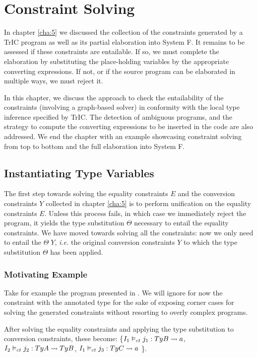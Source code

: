 \chapter{Constraint Solving}
\label{cha:6}

In chapter \ref{cha:5} we discussed the collection of the constraints generated by a TrIC program as well as its partial elaboration into System F. It remains to be assessed if these constraints are entailable. If so, we must complete the elaboration by substituting the place-holding variables by the appropriate converting expressions. If not, or if the source program can be elaborated in multiple ways, we must reject it.

In this chapter, we discuss the approach to check the entailability of the constraints (involving a graph-based solver) in conformity with the local type inference specified by TrIC. The detection of ambiguous programs, and the strategy to compute the converting expressions to be inserted in the code are also addressed. We end the chapter with an example showcasing constraint solving from top to bottom and the full elaboration into System F.


\section{Instantiating Type Variables}
\label{sc:cc}
The first step towards solving the equality constraints $E$ and the conversion constraints $Y$ collected in chapter \ref{cha:5} is to perform unification on the equality constraints $E$. Unless this process fails, in which case we immediately reject the program, it yields the type substitution $\Theta$ necessary to entail the equality constraints. We have moved towards solving all the constraints: now we only need to entail the $\Theta\; Y$, \textit{i.e.} the original conversion constraints $Y$ to which the type substitution $\Theta$ has been applied.
\subsection{Motivating Example}
Take for example the program presented in . We will ignore for now the constraint with the annotated type for the sake of exposing corner cases for solving the generated constraints without resorting to overly complex programs.

After solving the equality constraints and applying the type substitution to conversion constraints, these become: \{${I_1} \vDash_{ct} {j_1}: {TyB} \rightsquigarrow {a}$, ${I_2} \vDash_{ct} {j_2}: {TyA} \rightsquigarrow {TyB}$, ${I_1} \vDash_{ct} {j_3}: {TyC} \rightsquigarrow {a}$ \}.

